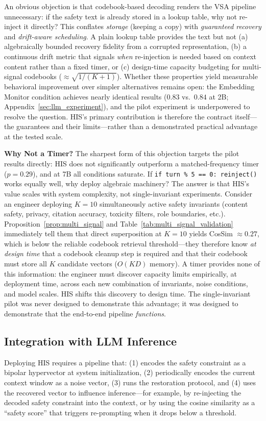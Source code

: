 \documentclass[a4paper,11pt]{article}
\begin{document}
An obvious objection is that codebook-based decoding renders the VSA pipeline unnecessary: if the safety text is already stored in a lookup table, why not re-inject it directly? This conflates \textit{storage} (keeping a copy) with \textit{guaranteed recovery} and \textit{drift-aware scheduling}. A plain lookup table provides the text but not (a) algebraically bounded recovery fidelity from a corrupted representation, (b) a continuous drift metric that signals \textit{when} re-injection is needed based on context content rather than a fixed timer, or (c) design-time capacity budgeting for multi-signal codebooks ($\approx\!\sqrt{1/(K{+}1)}$). Whether these properties yield measurable behavioral improvement over simpler alternatives remains open: the Embedding Monitor condition achieves nearly identical results ($0.83$ vs.\ $0.84$ at 2B; Appendix~\ref{sec:llm_experiment}), and the pilot experiment is underpowered to resolve the question. HIS's primary contribution is therefore the contract itself---the guarantees and their limits---rather than a demonstrated practical advantage at the tested scale.

\textbf{Why Not a Timer?} The sharpest form of this objection targets the pilot results directly: HIS does not significantly outperform a matched-frequency timer ($p = 0.29$), and at 7B all conditions saturate. If \texttt{if turn \% 5 == 0: reinject()} works equally well, why deploy algebraic machinery? The answer is that HIS's value scales with system complexity, not single-invariant experiments. Consider an engineer deploying $K = 10$ simultaneously active safety invariants (content safety, privacy, citation accuracy, toxicity filters, role boundaries, etc.). Proposition~\ref{prop:multi_signal} and Table~\ref{tab:multi_signal_validation} immediately tell them that direct superposition at $K = 10$ yields CosSim $\approx 0.27$, which is below the reliable codebook retrieval threshold---they therefore know \textit{at design time} that a codebook cleanup step is required and that their codebook must store all $K$ candidate vectors ($O(KD)$ memory). A timer provides none of this information: the engineer must discover capacity limits empirically, at deployment time, across each new combination of invariants, noise conditions, and model scales. HIS shifts this discovery to design time. The single-invariant pilot was never designed to demonstrate this advantage; it was designed to demonstrate that the end-to-end pipeline \textit{functions}.

\subsection{Integration with LLM Inference}
Deploying HIS requires a pipeline that: (1) encodes the safety constraint as a bipolar hypervector at system initialization, (2) periodically encodes the current context window as a noise vector, (3) runs the restoration protocol, and (4) uses the recovered vector to influence inference---for example, by re-injecting the decoded safety constraint into the context, or by using the cosine similarity as a ``safety score'' that triggers re-prompting when it drops below a threshold.
\end{document}
